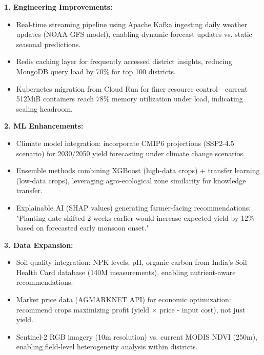 \documentclass[10pt,a4paper]{article}
\begin{document}
\textbf{1. Engineering Improvements:}
\begin{itemize}[leftmargin=*,itemsep=0pt]
\item Real-time streaming pipeline using Apache Kafka ingesting daily weather updates (NOAA GFS model), enabling dynamic forecast updates vs. static seasonal predictions.
\item Redis caching layer for frequently accessed district insights, reducing MongoDB query load by 70\% for top 100 districts.
\item Kubernetes migration from Cloud Run for finer resource control—current 512MiB containers reach 78\% memory utilization under load, indicating scaling headroom.
\end{itemize}

\textbf{2. ML Enhancements:}
\begin{itemize}[leftmargin=*,itemsep=0pt]
\item Climate model integration: incorporate CMIP6 projections (SSP2-4.5 scenario) for 2030/2050 yield forecasting under climate change scenarios.
\item Ensemble methods combining XGBoost (high-data crops) + transfer learning (low-data crops), leveraging agro-ecological zone similarity for knowledge transfer.
\item Explainable AI (SHAP values) generating farmer-facing recommendations: "Planting date shifted 2 weeks earlier would increase expected yield by 12\% based on forecasted early monsoon onset."
\end{itemize}

\textbf{3. Data Expansion:}
\begin{itemize}[leftmargin=*,itemsep=0pt]
\item Soil quality integration: NPK levels, pH, organic carbon from India's Soil Health Card database (140M measurements), enabling nutrient-aware recommendations.
\item Market price data (AGMARKNET API) for economic optimization: recommend crops maximizing profit (yield × price - input cost), not just yield.
\item Sentinel-2 RGB imagery (10m resolution) vs. current MODIS NDVI (250m), enabling field-level heterogeneity analysis within districts.
\end{itemize}
\end{document}
